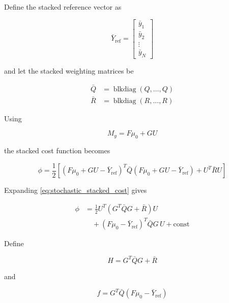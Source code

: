 Define the stacked reference vector as

\begin{equation}
    \bar{Y}_{\mathrm{ref}}
    =
    \begin{bmatrix}
        \bar{y}_1 \\
        \bar{y}_2 \\
        \vdots \\
        \bar{y}_N
    \end{bmatrix}
\end{equation}

and let the stacked weighting matrices be

\begin{align}
    \bar{Q}
    &=
    \operatorname{blkdiag}
    \left(
        Q,\ldots,Q
    \right)\\
    \bar{R}
    &=
    \operatorname{blkdiag}
    \left(
        R,\ldots,R
    \right)
\end{align}

Using

\begin{equation}
    M_y=F\mu_0+GU
\end{equation}

the stacked cost function becomes

\begin{equation}
    \phi
    =
    \frac{1}{2}
    \left[
        (F\mu_0+GU-\bar{Y}_{\mathrm{ref}})^T
        \bar{Q}
        (F\mu_0+GU-\bar{Y}_{\mathrm{ref}})
        +
        U^T\bar{R}U
    \right]
    \label{eq:stochastic_stacked_cost}
\end{equation}


Expanding \cref{eq:stochastic_stacked_cost} gives

\begin{align}
    \phi
    &=
    \frac{1}{2}
    U^T
    \left(
        G^T\bar{Q}G+\bar{R}
    \right)
    U
    \nonumber\\
    &\quad+
    (F\mu_0-\bar{Y}_{\mathrm{ref}})^T
    \bar{Q}G\,U
    +
    \text{const}
\end{align}

Define

\begin{equation}
    H
    =
    G^T\bar{Q}G+\bar{R}
\end{equation}

and

\begin{equation}
    f
    =
    G^T
    \bar{Q}
    \left(
        F\mu_0-\bar{Y}_{\mathrm{ref}}
    \right)
\end{equation}

